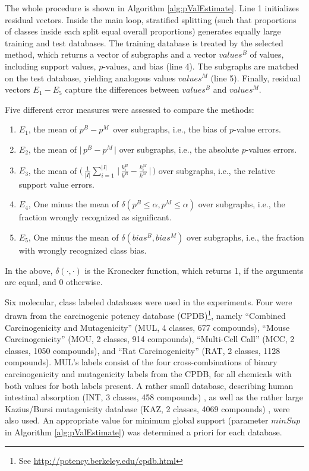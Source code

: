 \documentclass{sig-alternate}
\begin{document}
The whole procedure is shown in Algorithm \ref{alg:pValEstimate}.
Line 1 initializes residual vectors.
Inside the main loop, stratified splitting (such that proportions of classes
inside each split equal overall proportions) generates equally large training and test
databases. The training database is treated by the selected method, which
returns a vector of subgraphs and a vector $values^B$ of values,
including support values, $p$-values, and bias (line 4). The subgraphs are matched on
the test database, yielding analogous values $values^M$ (line 5). Finally, 
residual vectors $E_1-E_5$ capture the differences between $values^B$ and
$values^M$.

Five different
error measures were assessed to compare the methods:
\begin{enumerate}
  \item $E_1$, the mean of     $ p^B -p^M \,$                                                                                    over subgraphs, i.e., the bias of $p$-value errors.
  \item $E_2$, the mean of     $ \Big|\,p^B -p^M \,\Big|$                                                                        over subgraphs, i.e., the absolute $p$-values errors.
  \item $E_3$, the mean of     $ \Big(\,\frac{1}{|I|} \sum_{i=1}^{|I|} \,\Big|\,\frac{k^B_i}{k^B} - \frac{k^M_i}{k^M} \,\Big|\,\Big)$ over subgraphs, i.e., the relative support value errors.
  \item $E_4$, One minus the mean of $ \delta(p^B \le \alpha, p^M \le \alpha)$                                                         over subgraphs, i.e., the fraction wrongly recognized as significant.
  \item $E_5$, One minus the mean of $ \delta(bias^B, bias^M)$                                                                        over subgraphs, i.e., the fraction with wrongly recognized class bias.

\end{enumerate}
In the above, $\delta(\cdot,\cdot)$ is the {\sc Kronecker} function, which returns 1, if the arguments are equal, and 0 otherwise.

Six molecular, class labeled databases were used in the experiments. 
Four were drawn from the carcinogenic potency database
(CPDB)\footnote{See \url{http://potency.berkeley.edu/cpdb.html}}, namely 
``Combined Carcinogenicity and Mutagenicity'' (MUL, 4 classes, 677 compounds),
``Mouse Carcinogenicity'' (MOU, 2 classes, 914 compounds), 
``Multi-Cell Call'' (MCC, 2 classes, 1050 compounds), and 
``Rat Carcinogenicity'' (RAT, 2 classes, 1128 compounds). 
MUL's labels consist of the four cross-combinations of binary carcinogenicity
and mutagenicity labels from the CPDB, for all chemicals with both values for
both labels present.
A rather small database, describing human intestinal absorption (INT, 3 classes,
458 compounds) \cite{Suenderhauf10Combinatorial}, as well as the rather large
Kazius/Bursi mutagenicity database (KAZ, 2 classes, 4069 compounds)
\cite{kazius05derivation}, were also used. An appropriate value for minimum global
support (parameter $minSup$ in Algorithm \ref{alg:pValEstimate}) was determined a
priori for each database.
\end{document}

